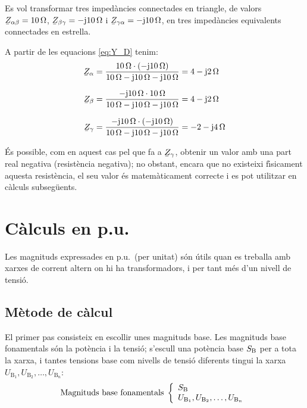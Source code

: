 \begin{exemple}
Es vol transformar tres imped\`{a}ncies connectades en triangle, de
valors $ \cmplx{Z}_{\alpha\beta}=10\unit{\ohm}$,
$\cmplx{Z}_{\beta\gamma}=-\ju10\unit{\ohm}$ i
$\cmplx{Z}_{\gamma\alpha}=-\ju10\unit{\ohm}$, en tres imped\`{a}ncies
equivalents connectades en estrella.

A partir de les equacions \eqref{eq:Y_D}  tenim:
\begin{align*}
   \cmplx{Z}_{\alpha} & = \frac{10\unit{\ohm}\cdot(-\ju10\unit{\ohm})}{10\unit{\ohm} - \ju10\unit{\ohm} - \ju10\unit{\ohm}} = 4 - \ju 2\unit{\ohm} \\[1.5ex]
   \cmplx{Z}_{\beta} & = \frac{-\ju10\unit{\ohm}\cdot10\unit{\ohm}}{10\unit{\ohm} - \ju10\unit{\ohm} - \ju10\unit{\ohm}} = 4 - \ju 2\unit{\ohm} \\[1.5ex]
\cmplx{Z}_{\gamma} &=
\frac{-\ju10\unit{\ohm}\cdot(-\ju10\unit{\ohm})}{10\unit{\ohm} -
\ju10\unit{\ohm} - \ju10\unit{\ohm}} = -2 - \ju 4\unit{\ohm}
\end{align*}

\'{E}s possible, com en aquest cas pel que fa a $\cmplx{Z}_{\gamma}$, obtenir un valor amb una
part real negativa (resist\`{e}ncia negativa); no obstant, encara que no existeixi f\'{\i}sicament
aquesta resist\`{e}ncia, el seu valor \'{e}s matem\`{a}ticament correcte i es pot utilitzar en c\`{a}lculs
subseg\"{u}ents.
\end{exemple}


\section{C\`{a}lculs en p.u.} \label{sec:seccio_pu} 

Les magnituds expressades en p.u.\ (per unitat) s\'{o}n \'{u}tils quan es treballa
amb xarxes de corrent altern on hi ha transformadors, i per tant m\'{e}s d'un nivell de tensi\'{o}.

\subsection{M\`{e}tode de c\`{a}lcul} 

 El primer pas consisteix en escollir unes magnituds
base. Les magnituds base fonamentals s\'{o}n la pot\`{e}ncia i la tensi\'{o}; s'escull una pot\`{e}ncia
base $S_\mathrm{B}$ per a tota la xarxa, i tantes tensions base com nivells de tensi\'{o} diferents
tingui la xarxa $U_{\text{B}_1}, U_{\text{B}_2}, \ldots, U_{\text{B}_n}$:
\begin{equation}
   \text{Magnituds base fonamentals}\;\left\{
\begin{array}{l}
   S_\mathrm{B} \\
   U_{\text{B}_1}, U_{\text{B}_2}, \ldots, U_{\text{B}_n}
\end{array}
\right.
\end{equation}

